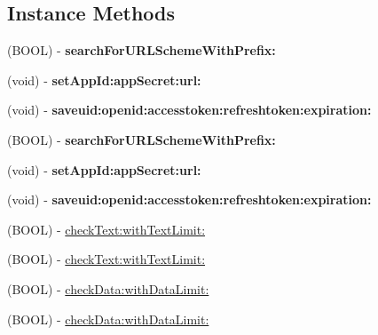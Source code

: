 \subsection*{Instance Methods}
\begin{DoxyCompactItemize}
\item 
\mbox{\label{interface_u_m_social_handler_abcf0f0beb1eacfd6d10a6ad9be58a7be}} 
(B\+O\+OL) -\/ {\bfseries search\+For\+U\+R\+L\+Scheme\+With\+Prefix\+:}
\item 
\mbox{\label{interface_u_m_social_handler_a5a45493cc4cc788c35de343ce2ba187f}} 
(void) -\/ {\bfseries set\+App\+Id\+:app\+Secret\+:url\+:}
\item 
\mbox{\label{interface_u_m_social_handler_a97cdffed7dc0ead08cfbbb5329caa392}} 
(void) -\/ {\bfseries saveuid\+:openid\+:accesstoken\+:refreshtoken\+:expiration\+:}
\item 
\mbox{\label{interface_u_m_social_handler_abcf0f0beb1eacfd6d10a6ad9be58a7be}} 
(B\+O\+OL) -\/ {\bfseries search\+For\+U\+R\+L\+Scheme\+With\+Prefix\+:}
\item 
\mbox{\label{interface_u_m_social_handler_a5a45493cc4cc788c35de343ce2ba187f}} 
(void) -\/ {\bfseries set\+App\+Id\+:app\+Secret\+:url\+:}
\item 
\mbox{\label{interface_u_m_social_handler_a97cdffed7dc0ead08cfbbb5329caa392}} 
(void) -\/ {\bfseries saveuid\+:openid\+:accesstoken\+:refreshtoken\+:expiration\+:}
\item 
(B\+O\+OL) -\/ \mbox{\hyperlink{interface_u_m_social_handler_a50a70e47f3feb853f947b55aebf3dde2}{check\+Text\+:with\+Text\+Limit\+:}}
\item 
(B\+O\+OL) -\/ \mbox{\hyperlink{interface_u_m_social_handler_a50a70e47f3feb853f947b55aebf3dde2}{check\+Text\+:with\+Text\+Limit\+:}}
\item 
(B\+O\+OL) -\/ \mbox{\hyperlink{interface_u_m_social_handler_aa40a617ff5de296f940d1bb9de9ca9d6}{check\+Data\+:with\+Data\+Limit\+:}}
\item 
(B\+O\+OL) -\/ \mbox{\hyperlink{interface_u_m_social_handler_aa40a617ff5de296f940d1bb9de9ca9d6}{check\+Data\+:with\+Data\+Limit\+:}}

\end{DoxyCompactItemize}
